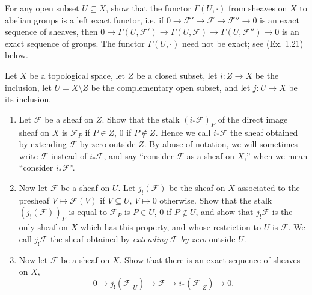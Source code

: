 \begin{exercise}%
	For any open subset $U \subseteq X $, show that the functor $\Gamma(U,\cdot) $ from sheaves on $X $ to abelian groups is a left exact functor, i.e. if $0 \to \mathcal{F}' \to \mathcal{F} \to \mathcal{F}'' \to 0 $ is an exact sequence of sheaves, then $0 \to \Gamma(U,\mathcal{F}') \to \Gamma(U,\mathcal{F}) \to \Gamma(U,\mathcal{F}'') \to 0 $ is an exact sequence of groups. The functor $\Gamma(U,\cdot) $ need not be exact; see (Ex. 1.21) below.
\end{exercise}

\begin{exercise}%
	Let $X $ be a topological space, let $Z $ be a closed subset, let $i: Z\to X $ be the inclusion, let $U = X \setminus Z $ be the complementary open subset, and let $j: U\to X $ be its inclusion.
	\begin{enumerate}
		\item Let $\mathcal{F} $ be a sheaf on $Z $. Show that the stalk $(i_\ast \mathcal{F})_P $ of the direct image sheaf on $X $ is $\mathcal{F}_P $ if $P\in Z $, $0 $ if $P\notin Z $. Hence we call $i_\ast \mathcal{F} $ the sheaf obtained by extending $\mathcal{F} $ by zero outside $Z $. By abuse of notation, we will sometimes write $\mathcal{F} $ instead of $i_\ast \mathcal{F} $, and say ``consider $\mathcal{F} $ as a sheaf on $X $,'' when we mean ``consider $i_\ast \mathcal{F}$''.
		\item Now let $\mathcal{F} $ be a sheaf on $U $. Let $j_!(\mathcal{F}) $ be the sheaf on $X $ associated to the presheaf $V\mapsto \mathcal{F}(V) $ if $V\subseteq U $, $V\mapsto 0 $ otherwise. Show that the stalk $(j_!(\mathcal{F}))_P $ is equal to $\mathcal{F}_P $ is $P\in U $, $0 $ if $P\notin U $, and show that $j_! \mathcal{F} $ is the only sheaf on $X $ which has this property, and whose restriction to $U $ is $\mathcal{F} $. We call $j_! \mathcal{F} $ the sheaf obtained by \textit{extending} $\mathcal{F} $ \textit{by zero} outside $U $.
		\item Now let $\mathcal{F} $ be a sheaf on $X $. Show that there is an exact sequence of sheaves on $X $,
			\[
				0 \to j_!(\mathcal{F}|_U) \to \mathcal{F} \to i_\ast(\mathcal{F}|_Z) \to 0
			.\]
	\end{enumerate}
\end{exercise}
